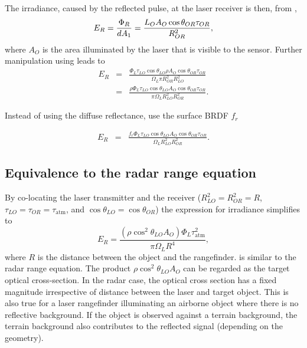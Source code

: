 
The irradiance, caused by the reflected pulse, at the laser receiver is then, from ,
\begin{equation}
E_R=\frac{\Phi_R}{d A_1}=\frac{L_O A_O \cos\theta_{OR}\tau_{OR}}{R_{OR}^2},
\end{equation}
where $A_O$ is the area illuminated by the laser that is visible to the
sensor. Further manipulation using  leads to
\begin{eqnarray}
E_R&=&\frac{\Phi_L \tau_{LO}\cos\theta_{LO}\rho A_O \cos\theta_{OR}\tau_{OR}}
{\Omega_L \pi R^2_{OR}R^2_{LO}}\nonumber \\
&=&\frac{
\rho \Phi_L \tau_{LO} \cos\theta_{LO} A_O \cos\theta_{OR} \tau_{OR}
}{
\pi \Omega_L R^2_{LO}R^2_{OR}
}.
\end{eqnarray}

Instead of using the diffuse reflectance, use the surface BRDF $f_r$

\begin{eqnarray}
E_R&=&\frac{
f_r \Phi_L \tau_{LO} \cos\theta_{LO} A_O \cos\theta_{OR} \tau_{OR}
}{
\Omega_L R^2_{LO}R^2_{OR}
}\label{erbrdf}.
\end{eqnarray}


\subsection{Equivalence to the radar range equation}


By co-locating the laser transmitter and the receiver ($R^2_{LO}=R^2_{OR}=R$, $\tau_{LO}=\tau_{OR}=\tau_\textrm{atm}$, and $\cos\theta_{LO}= \cos\theta_{OR}$) the expression for irradiance simplifies to
\begin{equation}
E_R = \frac{
(\rho \cos^2\theta_{LO} A_O)
\Phi_L \tau_\textrm{atm}^2
}{
\pi \Omega_L R^4
},\label{radar}
\end{equation}
where $R$ is the distance between the object and the rangefinder.
 is similar to the radar range equation. The product $\rho\cos^2\theta_{LO} A_O$ can be regarded as the target optical cross-section. In the radar case, the optical cross section has a fixed magnitude irrespective of distance between the laser and target object. This is also true for a laser rangefinder illuminating an airborne object where there is no reflective background.  If the object is observed against a terrain background, the terrain background also contributes to the reflected signal (depending on the geometry).


